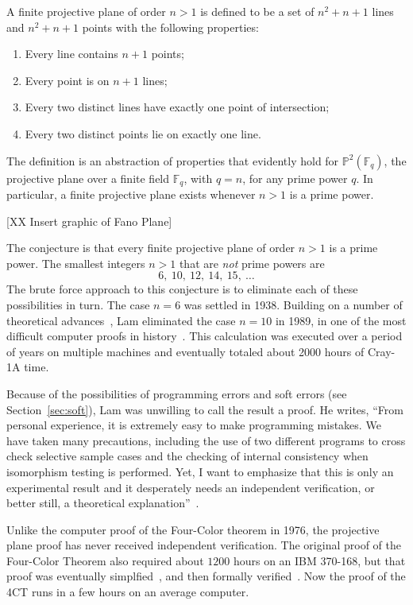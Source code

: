 \documentclass{llncs}
\newcommand{\ring}[1]{\mathbb{#1}}
\begin{document}
A finite projective plane of order $n>1$ is defined to be a set of
$n^2 + n + 1$ lines and $n^2 + n+ 1$ points with the following
properties:
\begin{enumerate}
\item Every line contains $n+1$ points;
\item Every point is on $n+1$ lines;
\item Every two distinct lines have exactly one point of intersection;
\item Every two distinct points lie on exactly one line.
\end{enumerate}

The definition is an abstraction of properties that evidently
hold for $\ring{P}^2(\ring{F}_q)$, the projective plane over a finite
field $\ring{F}_q$, with $q=n$, for any prime power $q$.  In
particular, a finite projective plane exists whenever $n>1$ is a prime
power.

[XX Insert graphic of Fano Plane]

The conjecture is that every finite projective plane
of order $n>1$ is a prime power.  The smallest integers $n>1$
that are {\it not} prime powers are
\[
6,~10,~12,~14,~15,~\dots
\]
The brute force approach to this conjecture is to eliminate each of
these possibilities in turn.  The case $n=6$ was settled in 1938.
Building on a number of theoretical advances~\cite{MST}, Lam eliminated the case
$n=10$ in 1989, in one of the most difficult computer proofs in
history~\cite{Lam89}.  This calculation was executed over
a period of years on multiple machines and eventually totaled about 2000
hours of Cray-1A time.  

Because of the possibilities of programming errors and soft errors
(see Section~\ref{sec:soft}), Lam was unwilling to call the result a
proof.  He writes, ``From personal experience, it is extremely easy to
make programming mistakes. We have taken many precautions, including
the use of two different programs to cross check selective sample
cases and the checking of internal consistency when isomorphism
testing is performed. Yet, I want to emphasize that this is only an
experimental result and it desperately needs an independent
verification, or better still, a theoretical
explanation''~\cite{LamS}.

Unlike the computer proof of the Four-Color theorem in 1976, the
projective plane proof has never received independent verification.
The original proof of the Four-Color Theorem also required about
$1200$ hours on an IBM 370-168, but that proof was eventually
simplfied~\cite{Robertson:1997:JCTB}, and then formally
verified~\cite{gonthier:2008:formal}.  Now the proof of the 4CT runs
in a few hours on an average computer.
\end{document}
